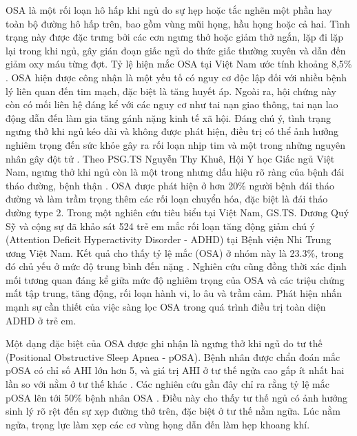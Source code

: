 OSA là một rối loạn hô hấp khi ngủ do sự hẹp hoặc tắc nghẽn một phần hay toàn
bộ đường hô hấp trên, bao gồm vùng mũi họng, hầu họng hoặc cả hai. Tình trạng
này được đặc trưng bởi các cơn ngưng thở hoặc giảm thở ngắn, lặp đi lặp lại
trong khi ngủ, gây gián đoạn giấc ngủ do thức giấc thường xuyên và dẫn đến giảm
oxy máu từng đợt. Tỷ lệ hiện mắc OSA tại Việt Nam ước tính khoảng 8,5\%
\cite{nguoimacOSA_VN}. OSA hiện được công nhận là một yếu tố có nguy cơ độc lập
đối với nhiều bệnh lý liên quan đến tim mạch, đặc biệt là tăng huyết áp. Ngoài
ra, hội chứng này còn có mối liên hệ đáng kể với các nguy cơ như tai nạn giao
thông, tai nạn lao động dẫn đến làm gia tăng gánh nặng kinh tế xã
hội\cite{osa_bike}\cite{Marin2005}\cite{drive_osa}. Đáng chú ý, tình trạng
ngưng thở khi ngủ kéo dài và không được phát hiện, điều trị có thể ảnh hưởng
nghiêm trọng đến sức khỏe gây ra rối loạn nhịp tim và một trong những nguyên
nhân gây đột tử \cite{sumarry_osa}. Theo PSG.TS Nguyễn Thy Khuê, Hội Y học Giấc
ngủ Việt Nam, ngưng thở khi ngủ còn là một trong nhưng dấu hiệu rõ ràng của
bệnh đái tháo đường, bệnh thận \cite{bsThyKhue}. OSA được phát hiện ở hơn 20\%
người bệnh đái tháo đường và làm trầm trọng thêm các rối loạn chuyển hóa, đặc
biệt là đái tháo đường type 2. Trong một nghiên cứu tiêu biểu tại Việt Nam,
GS.TS. Dương Quý Sỹ và cộng sự đã khảo sát 524 trẻ em mắc rối loạn tăng động
giảm chú ý (Attention Deficit Hyperactivity Disorder - ADHD) tại Bệnh viện Nhi
Trung ương Việt Nam. Kết quả cho thấy tỷ lệ mắc (OSA) ở nhóm này là 23.3\%,
trong đó chủ yếu ở mức độ trung bình đến nặng \cite{ThaySUCHildren}. Nghiên cứu
cũng đồng thời xác định mối tương quan đáng kể giữa mức độ nghiêm trọng của OSA
và các triệu chứng mất tập trung, tăng động, rối loạn hành vi, lo âu và trầm
cảm. Phát hiện nhấn mạnh sự cần thiết của việc sàng lọc OSA trong quá trình
điều trị toàn diện ADHD ở trẻ em.

Một dạng đặc biệt của OSA được ghi nhận là ngưng thở khi ngủ do tư thế
(Positional Obstructive Sleep Apnea - pOSA). Bệnh nhân được chẩn đoán mắc pOSA
có chỉ số AHI lớn hơn 5, và giá trị AHI ở tư thế ngửa cao gấp ít nhất hai lần
so với nằm ở tư thế khác \cite{heinzer2018}. Các nghiên cứu gần đây chỉ ra rằng
tỷ lệ mắc pOSA lên tới 50\% bệnh nhân OSA \cite{sabil2020}. Điều này cho thấy
tư thế ngủ có ảnh hưởng sinh lý rõ rệt đến sự xẹp đường thở trên, đặc biệt ở tư
thế nằm ngữa. Lúc nằm ngửa, trọng lực làm xẹp các cơ vùng họng dẫn đến làm hẹp
khoang khí.

